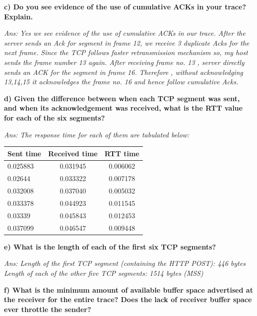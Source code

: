 \documentclass[11pt]{article}
\numberwithin{equation}{section}
\begin{document}
\textbf{ c) Do you see evidence of the use of cumulative ACKs in your trace? Explain.  }
 
\textsl{Ans: Yes we see evidence of the use of cumulative ACKs in our trace.  After the server sends an Ack for segment in frame 12, we receive 3 duplicate Acks for the next frame. Since the TCP follows faster retransmission mechanism so, my host sends the frame number 13 again. After receiving frame no. 13 , server directly sends an ACK for the segment in frame 16. Therefore , without acknowledging 13,14,15 it acknowledges the frame no. 16 and hence follow cumulative Acks. } \newline

\textbf{ d) Given the difference between when each TCP segment was sent, and when its acknowledgement was received, what is the RTT value for each of the six segments?  }

\textsl{Ans: The response time for each of them are tabulated below:}

\begin{table}[H]
\begin{center}
    \begin{tabular}{|p{2cm}|c|c|}
    \hline
    Sent time & Received time & RTT time\\ \hline
    
    0.025883 & 0.031945 & 0.006062\\ \hline
    0.02644 & 0.033322 & 0.007178  \\ \hline
    0.032008 & 0.037040 & 0.005032\\ \hline
    0.033378 & 0.044923 & 0.011545\\ \hline
    0.03339 & 0.045843 & 0.012453 \\ \hline
    0.037099 & 0.046547 & 0.009448\\ \hline
   
    \end{tabular}
\end{center}
\end{table}

\textbf{ e) What is the length of each of the first six TCP segments? }

\textsl{ Ans: Length of the first TCP segment (containing the HTTP POST): 446 bytes
Length of each of the other five TCP segments: 1514 bytes (MSS)}
\newline

\textbf{ f) What is the minimum amount of available buffer space advertised at the receiver for the entire trace? Does the lack of receiver buffer space ever throttle the sender? }
\end{document}
